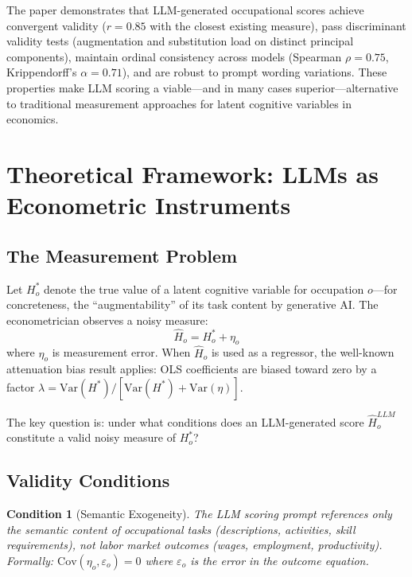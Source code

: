 \documentclass[11pt,a4paper]{article}
\newtheorem{condition}{Condition}
\theoremstyle{definition}
\begin{document}
The paper demonstrates that LLM-generated occupational scores achieve convergent validity ($r = 0.85$ with the closest existing measure), pass discriminant validity tests (augmentation and substitution load on distinct principal components), maintain ordinal consistency across models (Spearman $\rho = 0.75$, Krippendorff's $\alpha = 0.71$), and are robust to prompt wording variations. These properties make LLM scoring a viable---and in many cases superior---alternative to traditional measurement approaches for latent cognitive variables in economics.


\section{Theoretical Framework: LLMs as Econometric Instruments}
\label{sec:theory}

\subsection{The Measurement Problem}

Let $H^*_o$ denote the true value of a latent cognitive variable for occupation $o$---for concreteness, the ``augmentability'' of its task content by generative AI. The econometrician observes a noisy measure:
\begin{equation}
\hat{H}_o = H^*_o + \eta_o
\end{equation}
where $\eta_o$ is measurement error. When $\hat{H}_o$ is used as a regressor, the well-known attenuation bias result applies: OLS coefficients are biased toward zero by a factor $\lambda = \text{Var}(H^*) / [\text{Var}(H^*) + \text{Var}(\eta)]$.

The key question is: under what conditions does an LLM-generated score $\hat{H}^{LLM}_o$ constitute a valid noisy measure of $H^*_o$?

\subsection{Validity Conditions}

\begin{condition}[Semantic Exogeneity]
\label{cond:exog}
The LLM scoring prompt references only the semantic content of occupational tasks (descriptions, activities, skill requirements), not labor market outcomes (wages, employment, productivity). Formally: $\text{Cov}(\eta_o, \varepsilon_o) = 0$ where $\varepsilon_o$ is the error in the outcome equation.
\end{condition}
\end{document}
